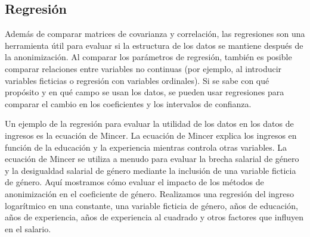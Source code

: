 \documentclass[
]{book}
\newenvironment{Shaded}{\begin{snugshade}}{\end{snugshade}}
\newcommand{\AttributeTok}[1]{\textcolor[rgb]{0.77,0.63,0.00}{#1}}
\newcommand{\CommentTok}[1]{\textcolor[rgb]{0.56,0.35,0.01}{\textit{#1}}}
\newcommand{\ConstantTok}[1]{\textcolor[rgb]{0.00,0.00,0.00}{#1}}
\newcommand{\DocumentationTok}[1]{\textcolor[rgb]{0.56,0.35,0.01}{\textbf{\textit{#1}}}}
\newcommand{\FunctionTok}[1]{\textcolor[rgb]{0.00,0.00,0.00}{#1}}
\newcommand{\NormalTok}[1]{#1}
\newcommand{\SpecialCharTok}[1]{\textcolor[rgb]{0.00,0.00,0.00}{#1}}
\newcommand{\StringTok}[1]{\textcolor[rgb]{0.31,0.60,0.02}{#1}}
\theoremstyle{definition}
\theoremstyle{definition}
\theoremstyle{definition}
\theoremstyle{definition}
\theoremstyle{remark}
\begin{document}
\begin{Shaded}
\end{Shaded}

\hypertarget{regresiuxf3n}{%
\subsection{Regresión}\label{regresiuxf3n}}

Además de comparar matrices de covarianza y correlación, las regresiones son una herramienta útil para evaluar si la estructura de los datos se mantiene después de la anonimización. Al comparar los parámetros de regresión, también es posible comparar relaciones entre variables no continuas (por ejemplo, al introducir variables ficticias o regresión con variables ordinales). Si se sabe con qué propósito y en qué campo se usan los datos, se pueden usar regresiones para comparar el cambio en los coeficientes y los intervalos de confianza.

Un ejemplo de la regresión para evaluar la utilidad de los datos en los datos de ingresos es la ecuación de Mincer. La ecuación de Mincer explica los ingresos en función de la educación y la experiencia mientras controla otras variables. La ecuación de Mincer se utiliza a menudo para evaluar la brecha salarial de género y la desigualdad salarial de género mediante la inclusión de una variable ficticia de género. Aquí mostramos cómo evaluar el impacto de los métodos de anonimización en el coeficiente de género. Realizamos una regresión del
ingreso logarítmico en una constante, una variable ficticia de género, años de educación, años de experiencia, años de experiencia al cuadrado y otros factores que influyen en el salario.
\end{document}
